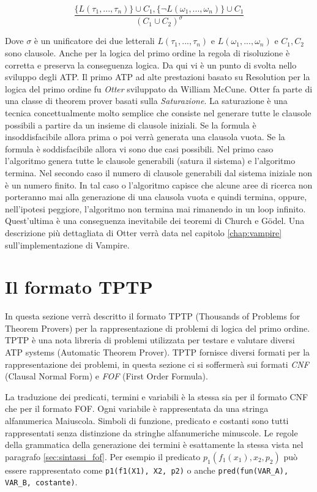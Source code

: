 \documentclass[./main.tex]{subfiles}
\begin{document}
$$ \frac{\{L(\tau_1, ..., \tau_n)\} \cup C_1, \{\lnot L(\omega_1, ..., \omega_n)\} \cup C_1}{(C_1 \cup C_2)^\sigma} $$

Dove $\sigma$ è un unificatore dei due letterali $L(\tau_1, ..., \tau_n)$ e $L(\omega_1, ..., \omega_n)$ e $C_1, C_2$ sono clausole.
Anche per la logica del primo ordine la regola di risoluzione è corretta e preserva la conseguenza logica.
Da qui vi è un punto di svolta nello sviluppo degli ATP.
Il primo ATP ad alte prestazioni basato su Resolution per la logica del primo ordine fu \textit{Otter} sviluppato da William McCune.
Otter fa parte di una classe di theorem prover basati sulla \textit{Saturazione}.
La saturazione è una tecnica concettualmente molto semplice che consiste nel generare 
tutte le clausole possibili a partire da un insieme di clausole iniziali.
Se la formula è insoddisfacibile allora prima o poi verrà generata una clausola vuota.
Se la formula è soddisfacibile allora vi sono due casi possibili.
Nel primo caso l'algoritmo genera tutte le clausole generabili (satura il sistema) e l'algoritmo termina.
Nel secondo caso il numero di clausole generabili dal sistema iniziale non è un numero finito.
In tal caso o l'algoritmo capisce che alcune aree di ricerca non porteranno mai alla generazione 
di una clausola vuota e quindi termina,
oppure, nell'ipotesi peggiore, l'algoritmo non termina mai rimanendo in un loop infinito.
Quest'ultima è una conseguenza inevitabile dei teoremi di Church e Gödel.
Una descrizione più dettagliata di Otter verrà data nel capitolo \ref{chap:vampire} sull'implementazione di Vampire.




\section{Il formato TPTP}
In questa sezione verrà descritto il formato TPTP \cite{tptpLan} (Thousands of Problems for Theorem Provers) 
per la rappresentazione di problemi di logica del primo ordine.
TPTP è una nota libreria di problemi utilizzata per testare e valutare diversi ATP systems (Automatic Theorem Prover).
TPTP fornisce diversi formati per la rappresentazione dei problemi,
in questa sezione ci si soffermerà sui formati \textit{CNF} (Clausal Normal Form) e \textit{FOF} (First Order Formula).


La traduzione dei predicati, termini e variabili è la stessa sia per il formato CNF che per il formato FOF.
Ogni variabile è rappresentata da una stringa alfanumerica Maiuscola. 
Simboli di funzione, predicato e costanti sono tutti rappresentati senza distinzione da stringhe alfanumeriche minuscole.
Le regole della grammatica della generazione dei termini è esattamente la stessa vista nel paragrafo \ref{sec:sintassi_fof}.
Per esempio il predicato $p_1(f_1(x_1), x_2, p_2)$ 
può essere rappresentato come \texttt{p1(f1(X1), X2, p2)} o anche \texttt{pred(fun(VAR\_A), VAR\_B, costante)}.
\end{document}
